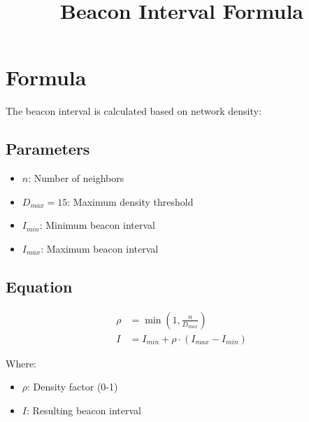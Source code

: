 \documentclass{article}
\title{Beacon Interval Formula}
\author{}
\date{}
\begin{document}
\maketitle

\section*{Formula}

The beacon interval is calculated based on network density:

\subsection*{Parameters}
\begin{itemize}
    \item $n$: Number of neighbors
    \item $D_{max} = 15$: Maximum density threshold
    \item $I_{min}$: Minimum beacon interval
    \item $I_{max}$: Maximum beacon interval
\end{itemize}

\subsection*{Equation}
\begin{align}
\rho &= \min\left(1, \frac{n}{D_{max}}\right) \\
I &= I_{min} + \rho \cdot (I_{max} - I_{min})
\end{align}

Where:
\begin{itemize}
    \item $\rho$: Density factor (0-1)
    \item $I$: Resulting beacon interval
\end{itemize}
\end{document}
